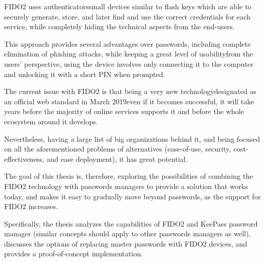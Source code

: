 FIDO2 uses authenticators\textemdash small devices similar to flash keys\textemdash
which are able to securely generate, store, and later find and use the correct credentials for each service,
while completely hiding the technical aspects from the end-users.

This approach provides several advantages over passwords, including complete elimination of phishing attacks,
while keeping a great level of usability\textemdash from the users' perspective, using the device involves only connecting it to the computer and unlocking it with a short PIN when prompted.

The current issue with FIDO2 is that being a very new technology\textemdash de\-sig\-na\-ted as an official web standard in March 2019\textemdash even if it becomes successful,
it will take years before the majority of online services supports it and before the whole ecosystem around it develops.

Nevertheless, having a large list of big organizations behind it, and being focused on
all the aforementioned problems of alternatives (ease-of-use, security, cost-effectiveness, and ease deployment),
it has great potential.

The goal of this thesis is, therefore, exploring the possibilities of combining the FIDO2 technology with passwords managers
to provide a solution that works today,
and makes it easy to gradually move beyond passwords, as the support for FIDO2 increases.

Specifically, the thesis analyzes the capabilities of FIDO2 and KeePass password manager
(similar concepts should apply to other passwords managers as well), discusses the options
of replacing master passwords with FIDO2 devices, and provides a proof-of-concept implementation.
